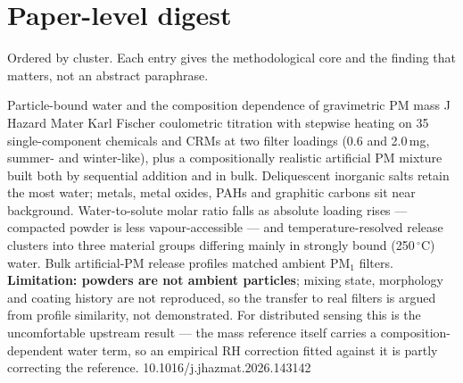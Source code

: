 \documentclass[10pt]{article}
\begin{document}
\clearpage

\section*{\sffamily\bfseries\color{Deep}Paper-level digest}
\vspace{-1.5mm}{\color{Amber}\rule{\linewidth}{1.1pt}}\vspace{1mm}

{\fontsize{7.4}{9}\selectfont\color{Slate}Ordered by cluster. Each entry gives the
methodological core and the finding that matters, not an abstract paraphrase.\par}


{Particle-bound water and the composition dependence of gravimetric PM mass}
{J Hazard Mater}
{Karl Fischer coulometric titration with stepwise heating on 35 single-component
chemicals and CRMs at two filter loadings (0.6 and 2.0\,mg, summer- and winter-like),
plus a compositionally realistic artificial PM mixture built both by sequential addition
and in bulk. Deliquescent inorganic salts retain the most water; metals, metal oxides,
PAHs and graphitic carbons sit near background. Water-to-solute molar ratio falls as
absolute loading rises --- compacted powder is less vapour-accessible --- and
temperature-resolved release clusters into three material groups differing mainly in
strongly bound (250\,$^\circ$C) water. Bulk artificial-PM release profiles matched
ambient PM$_1$ filters. \textbf{Limitation: powders are not ambient particles}; mixing
state, morphology and coating history are not reproduced, so the transfer to real filters
is argued from profile similarity, not demonstrated. For distributed sensing this is the
uncomfortable upstream result --- the mass reference itself carries a
composition-dependent water term, so an empirical RH correction fitted against it is
partly correcting the reference.}
{10.1016/j.jhazmat.2026.143142}
\end{document}
